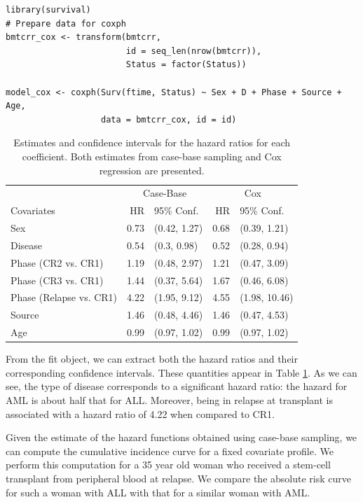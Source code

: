 \begin{verbatim}
library(survival)
# Prepare data for coxph
bmtcrr_cox <- transform(bmtcrr, 
                        id = seq_len(nrow(bmtcrr)),
                        Status = factor(Status))

model_cox <- coxph(Surv(ftime, Status) ~ Sex + D + Phase + Source + Age,
                   data = bmtcrr_cox, id = id)
\end{verbatim}

\begin{table}

\caption{\label{tab:bmtcrr-cis}Estimates and confidence intervals for the hazard ratios for each coefficient. Both estimates from case-base sampling and Cox regression are presented.}
\centering
\begin{tabular}[t]{lrlrl}
\toprule
\multicolumn{1}{c}{ } & \multicolumn{2}{c}{Case-Base} & \multicolumn{2}{c}{Cox} \\
\cmidrule(l{3pt}r{3pt}){2-3} \cmidrule(l{3pt}r{3pt}){4-5}
Covariates & HR & 95\% Conf. & HR & 95\% Conf.\\
\midrule
Sex & 0.73 & (0.42, 1.27) & 0.68 & (0.39, 1.21)\\
Disease & 0.54 & (0.3, 0.98) & 0.52 & (0.28, 0.94)\\
Phase (CR2 vs. CR1) & 1.19 & (0.48, 2.97) & 1.21 & (0.47, 3.09)\\
Phase (CR3 vs. CR1) & 1.44 & (0.37, 5.64) & 1.67 & (0.46, 6.08)\\
Phase (Relapse vs. CR1) & 4.22 & (1.95, 9.12) & 4.55 & (1.98, 10.46)\\
\addlinespace
Source & 1.46 & (0.48, 4.46) & 1.46 & (0.47, 4.53)\\
Age & 0.99 & (0.97, 1.02) & 0.99 & (0.97, 1.02)\\
\bottomrule
\end{tabular}
\end{table}

From the fit object, we can extract both the hazard ratios and their corresponding confidence intervals. These quantities appear in Table \ref{tab:bmtcrr-cis}. As we can see, the type of disease corresponds to a significant hazard ratio: the hazard for AML is about half that for ALL. Moreover, being in relapse at transplant is associated with a hazard ratio of 4.22 when compared to CR1.

Given the estimate of the hazard functions obtained using case-base sampling, we can compute the cumulative incidence curve for a fixed covariate profile. We perform this computation for a 35 year old woman who received a stem-cell transplant from peripheral blood at relapse. We compare the absolute risk curve for such a woman with ALL with that for a similar woman with AML.

